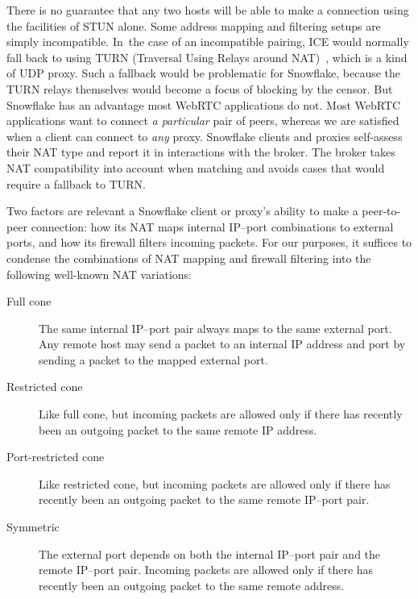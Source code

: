 \documentclass[letterpaper,twocolumn]{article}
\begin{document}
There is no guarantee that any two hosts will be able to make
a connection using the facilities of STUN alone.
Some address mapping and
filtering setups are simply incompatible.
In~the case of an incompatible pairing,
ICE would normally fall back to using
TURN (Traversal Using Relays around NAT)~\cite{rfc8656},
which is a kind of UDP proxy.
Such a fallback would be problematic for Snowflake,
because the TURN relays themselves
would become a focus of blocking by the censor.
But Snowflake has an advantage most WebRTC applications do not.
Most WebRTC applications want to connect \emph{a particular} pair of peers,
whereas we are satisfied when a client can connect to \emph{any} proxy.
Snowflake clients and proxies self-assess their NAT type
and report it in interactions with the broker.
The broker takes NAT compatibility into account when matching
and avoids cases that would require a fallback to TURN.


Two factors are relevant
a Snowflake client or proxy's
ability to make a peer-to-peer connection:
how its NAT maps internal IP--port combinations to external ports,
and how its firewall filters incoming packets.
For our purposes, it suffices
to condense the combinations of NAT mapping and firewall filtering
into the following well-known NAT variations:

\begin{description}
\item[Full cone]
The same internal IP--port pair always maps to the same external port.
Any remote host may send a packet to an internal IP address and port by sending a packet to the
mapped external port.
\item[Restricted cone]
Like full cone,
but incoming packets
are allowed only if
there has recently been an outgoing packet
to the same remote IP address.
\item[Port-restricted cone]
Like restricted cone,
but incoming packets are allowed only if
there has recently been an outgoing packet
to the same remote IP--port pair.
\item[Symmetric]
The external port depends on both
the internal IP--port pair and the remote IP--port pair.
Incoming packets are allowed only if
there has recently been an outgoing
packet to the same remote address.
\end{description}
\end{document}
